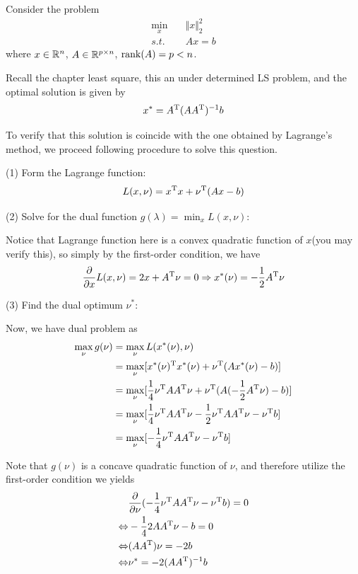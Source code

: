 \begin{example}
	Consider the problem
	\begin{align*}
		\min_x \quad &\Vert x \Vert_2^2\\
		s.t.\quad &Ax = b
	\end{align*}
	where $x\in\mathbb{R}^n$, $A\in\mathbb{R}^{p\times n}$, $\operatorname{rank}(A) = p< n$.
	
	Recall the chapter least square, this an under determined LS problem, and the optimal solution is given by 
	$$x^* = A^{{\rm T}}(AA^{{\rm T}})^{-1}b$$
	
	To verify that this solution is coincide with the one obtained by Lagrange's method, we proceed following procedure to solve this question.
	
	(1) Form the Lagrange function:
	 $$L(x, \nu) = x^{{\rm T}}x + \nu^{{\rm T}}(Ax - b)$$
	
	(2) Solve for the dual function $g(\lambda) = \min_x L(x, \nu)$:
		
		Notice that Lagrange function here is a convex quadratic function of $x$(you may verify this), so simply by the first-order condition, we have
		$$\frac{\partial}{\partial x} L(x, \nu) = 2x+A^{{\rm T}}\nu = 0\Rightarrow x^*(\nu) = -\frac{1}{2}A^{{\rm T}}\nu$$

	(3) Find the dual optimum $\nu^*$:
	
	Now, we have dual problem as
	\begin{align*}
		\max_{\nu} g(\nu) &= \max_{\nu} L(x^*(\nu), \nu)\\
		&= \max_{\nu}[x^*(\nu)^{{\rm T}}x^*(\nu) + \nu^{{\rm T}}(Ax^*(\nu) - b)]\\
		&= \max_{\nu}[\frac{1}{4}\nu^{{\rm T}}AA^{{\rm T}}\nu + \nu^{{\rm T}}(A(-\frac{1}{2}A^{{\rm T}}\nu)-b)]\\
		&= \max_{\nu}[\frac{1}{4}\nu^{{\rm T}}AA^{{\rm T}}\nu - \frac{1}{2}\nu^{{\rm T}}AA^{{\rm T}}\nu - \nu^{{\rm T}}b]\\
		&= \max_{\nu}[-\frac{1}{4}\nu^{{\rm T}}AA^{{\rm T}}\nu - \nu^{{\rm T}}b]
	\end{align*}
	
	Note that $g(\nu)$ is a concave quadratic function of $\nu$, and therefore utilize the first-order condition we yields
	\begin{align*}
	&\frac{\partial}{\partial \nu}(-\frac{1}{4}\nu^{{\rm T}}AA^{{\rm T}}\nu - \nu^{{\rm T}}b)= 0\\
	\Leftrightarrow&-\frac{1}{4} 2AA^{{\rm T}}\nu - b = 0\\
	\Leftrightarrow& (AA^{{\rm T}})\nu = -2b\\
	\Leftrightarrow& \nu^* = -2(AA^{{\rm T}})^{-1}b
	\end{align*}


\end{example}
